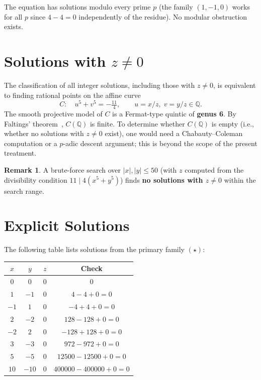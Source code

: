 \documentclass[12pt,a4paper]{article}
\theoremstyle{definition}
\newtheorem{remark}[theorem]{Remark}
\newcommand{\Q}{\mathbb{Q}}
\begin{document}
The equation has solutions modulo every prime $p$ (the family $(1,-1,0)$ works for all
$p$ since $4 - 4 = 0$ independently of the residue).  No modular obstruction exists.

\section{Solutions with $z \neq 0$}\label{sec:z-nonzero}

The classification of all integer solutions, including those with $z \neq 0$, is
equivalent to finding rational points on the affine curve
\[
  C\colon\quad u^5 + v^5 = -\tfrac{11}{4},
  \qquad u = x/z,\; v = y/z \in \Q.
\]
The smooth projective model of $C$ is a Fermat-type quintic of \textbf{genus 6}.
By Faltings' theorem~\cite{faltings83}, $C(\Q)$ is finite.  To determine whether
$C(\Q)$ is empty (i.e., whether no solutions with $z \neq 0$ exist), one would need
a Chabauty--Coleman computation or a $p$-adic descent argument; this is beyond
the scope of the present treatment.

\begin{remark}
  A brute-force search over $|x|, |y| \leq 50$ (with $z$ computed from the
  divisibility condition $11 \mid 4(x^5 + y^5)$) finds \textbf{no solutions with
  $z \neq 0$} within the search range.
\end{remark}

\section{Explicit Solutions}\label{sec:explicit}

The following table lists solutions from the primary family $(\star)$:

\begin{center}
\begin{tabular}{cccc}
  \toprule
  $x$ & $y$ & $z$ & Check \\
  \midrule
  $0$ & $0$ & $0$ & $0$ \\
  $1$ & $-1$ & $0$ & $4 - 4 + 0 = 0$ \\
  $-1$ & $1$ & $0$ & $-4 + 4 + 0 = 0$ \\
  $2$ & $-2$ & $0$ & $128 - 128 + 0 = 0$ \\
  $-2$ & $2$ & $0$ & $-128 + 128 + 0 = 0$ \\
  $3$ & $-3$ & $0$ & $972 - 972 + 0 = 0$ \\
  $5$ & $-5$ & $0$ & $12500 - 12500 + 0 = 0$ \\
  $10$ & $-10$ & $0$ & $400000 - 400000 + 0 = 0$ \\
  \bottomrule
\end{tabular}
\end{center}
\end{document}
